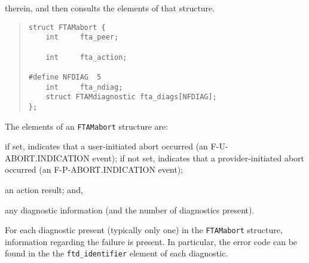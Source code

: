therein,
and then consults the elements of that structure.
\begin{quote}\small\begin{verbatim}
struct FTAMabort {
    int     fta_peer;

    int     fta_action;

#define NFDIAG  5
    int     fta_ndiag;
    struct FTAMdiagnostic fta_diags[NFDIAG];
};
\end{verbatim}\end{quote}
The elements of an \verb"FTAMabort" structure are:
\begin{describe}
\item[\verb"fta\_peer":] if set, indicates that a user-initiated abort occurred
(an {\sf F-U-ABORT.INDICATION\/} event);
if not set, indicates that a provider-initiated abort occurred
(an {\sf F-P-ABORT.INDICATION\/} event);

\item[\verb"fta\_action":] an action result;
and,

\item[\verb"fta\_diags"/\verb"fta\_ndiag":] any diagnostic information
(and the number of diagnostics present).
\end{describe}
For each diagnostic present (typically only one) in the \verb"FTAMabort"
structure,
information regarding the failure is present.
In particular,
the error code can be found in the
the \verb"ftd_identifier" element of each diagnostic.

